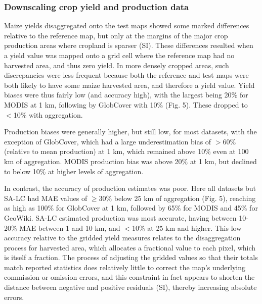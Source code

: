 \documentclass[a4paper]{article}
\begin{document}
\subsubsection*{Downscaling crop yield and production data}
\vspace{-0.2 cm}
Maize yields disaggregated onto the test maps showed some marked differences relative to the reference map, but only at the margins of the major crop production areas where cropland is sparser (SI). These differences resulted when a yield value was mapped onto a grid cell where the reference map had no harvested area, and thus zero yield. In more densely cropped areas, such discrepancies were less frequent because both the reference and test maps were both likely to have some maize harvested area, and therefore a yield value.  Yield biases were thus fairly low (and accuracy high), with the largest being 20\% for MODIS at 1 km, following by GlobCover with 10\% (Fig. 5). These dropped to $<$10\% with aggregation.  

Production biases were generally higher, but still low, for most datasets, with the exception of GlobCover, which had a large underestimation bias of $>$60\% (relative to mean production) at 1 km, which remained above 10\% even at 100 km of aggregation. MODIS production bias was above 20\% at 1 km, but declined to below 10\% at higher levels of aggregation.  

In contrast, the accuracy of production estimates was poor. Here all datasets but SA-LC had MAE values of $\geq$30\% below 25 km of aggregation (Fig. 5), reaching as high as 100\% for GlobCover at 1 km, followed by 65\% for MODIS and 45\% for GeoWiki. SA-LC estimated production was most accurate, having between 10-20\% MAE between 1 and 10 km, and $<$10\% at 25 km and higher.  This low accuracy relative to the gridded yield measures relates to the disaggregation process for harvested area, which allocates a fractional value to each pixel, which is itself a fraction. The process of adjusting the gridded values so that their totals match reported statistics does relatively little to correct the map's underlying commission or omission errors, and this constraint in fact appears to shorten the distance between negative and positive residuals (SI), thereby increasing absolute errors.  

\end{document}
